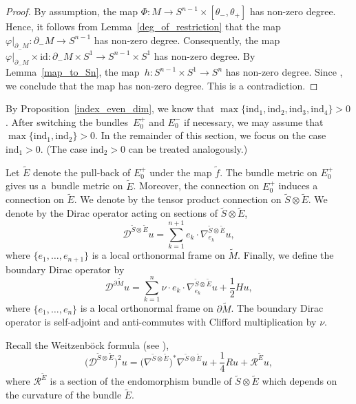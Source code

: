 \documentclass[pdftex]{sigma}
\numberwithin{equation}{section}
\newcommand{\id}{\mathrm{id}}
\begin{document}
\begin{proof}
By assumption, the map $\Phi\colon M \to S^{n-1} \times [\theta_-,\theta_+]$ has non-zero degree.
Hence, it follows from Lemma~\ref{deg_of_restriction} that the map $\varphi|_{\partial_- M}\colon \partial_- M \to S^{n-1}$ has non-zero degree.
Consequently, the map $\varphi|_{\partial_- M} \times \id\colon \partial_- M \times S^1 \to S^{n-1} \times S^1$ has non-zero degree. By Lemma~\ref{map_to_Sn}, the map~${h\colon S^{n-1} \times S^1 \to S^n}$ has non-zero degree.
Since \smash{$\tilde{f}|_{\partial_- \tilde{M}} = h \circ (\varphi|_{\partial_- M} \times \id)$}, we conclude that the map  has non-zero degree.
This is a contradiction.
\end{proof}

By Proposition~\ref{index_even_dim}, we know that $\max \{\mathrm{ind}_1,\mathrm{ind}_2, \mathrm{ind}_3, \mathrm{ind}_4\} > 0$. After switching the bundles~$E_0^+$ and $E_0^-$ if necessary, we may assume that $\max \{\mathrm{ind}_1,\mathrm{ind}_2\} > 0$.
In the remainder of this section, we focus on the case $\mathrm{ind}_1 > 0$.
(The case $\mathrm{ind}_2 > 0$ can be treated analogously.)

Let $\tilde{E}$ denote the pull-back of $E_0^+$ under the map $\tilde{f}$. The bundle metric on $E_0^+$ gives us a~bundle metric on $\tilde{E}$. Moreover, the connection on $E_0^+$ induces a connection on $\tilde{E}$. We denote by  the tensor product connection on $\tilde{S} \otimes \tilde{E}$. We denote by  the Dirac operator acting on sections of $\tilde{S} \otimes \tilde{E}$,
\[
 \mathcal{D}^{\tilde{S} \otimes \tilde{E}} u = \sum_{k=1}^{n+1} e_k \cdot \nabla_{e_k}^{\tilde{S} \otimes \tilde{E}} u,
\]
where $\{e_1, \ldots, e_{n+1}\}$ is a local orthonormal frame on $\tilde{M}$.
Finally, we define the boundary Dirac operator by
\[
 \mathcal{D}^{\partial \tilde{M}} u = \sum_{k=1}^n \nu \cdot e_k \cdot \nabla_{e_k}^{\tilde{S} \otimes \tilde{E}} u + \frac{1}{2} H u,
\]
where $\{e_1,\hdots,e_n\}$ is a local orthonormal frame on $\partial \tilde{M}$.
The boundary Dirac operator is self-adjoint and anti-commutes with Clifford multiplication by $\nu$.

Recall the Weitzenb\"ock formula (see \cite[Theorem~8.17, Chapter~II]{Lawson-Michelsohn}),
\[
 \big(\mathcal{D}^{\tilde{S} \otimes \tilde{E}}\big)^2 u
 =
 \big(\nabla^{\tilde{S} \otimes \tilde{E}}\big)^*\nabla^{\tilde{S} \otimes \tilde{E}} u + \frac{1}{4} R u + \mathcal{R}^{\tilde{E}} u,
\]
where $\mathcal{R}^{\tilde{E}}$ is a section of the endomorphism bundle of $\tilde{S} \otimes \tilde{E}$ which depends on the curvature of the bundle $\tilde{E}$.
\end{document}
